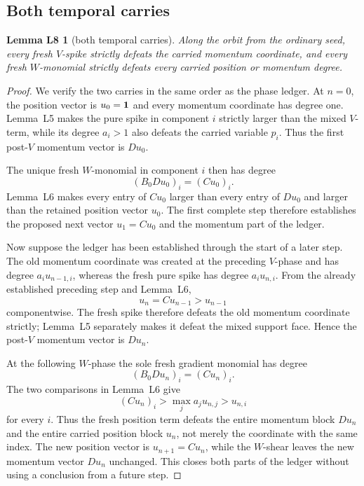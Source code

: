 \documentclass[11pt,letterpaper]{article}
\theoremstyle{plain}
\newtheorem*{lemLeight}{Lemma L8}
\begin{document}
\subsection{Both temporal carries}

\begin{lemLeight}[both temporal carries]
Along the orbit from the ordinary seed, every fresh $V$-spike strictly defeats the carried momentum coordinate, and every fresh $W$-monomial strictly defeats every carried position or momentum degree.
\end{lemLeight}

\begin{proof}
We verify the two carries in the same order as the phase ledger.  At $n=0$, the position vector is $u_0=\mathbf{1}$ and every momentum coordinate has degree one.  Lemma~L5 makes the pure spike in component $i$ strictly larger than the mixed $V$-term, while its degree $a_i>1$ also defeats the carried variable $p_i$.  Thus the first post-$V$ momentum vector is $Du_0$.

The unique fresh $W$-monomial in component $i$ then has degree
\[
(B_0Du_0)_i=(Cu_0)_i.
\]
Lemma~L6 makes every entry of $Cu_0$ larger than every entry of $Du_0$ and larger than the retained position vector $u_0$.  The first complete step therefore establishes the proposed next vector $u_1=Cu_0$ and the momentum part of the ledger.

Now suppose the ledger has been established through the start of a later step.  The old momentum coordinate was created at the preceding $V$-phase and has degree $a_i u_{n-1,i}$, whereas the fresh pure spike has degree $a_i u_{n,i}$.  From the already established preceding step and Lemma~L6,
\[
u_n=Cu_{n-1}>u_{n-1}
\]
componentwise.  The fresh spike therefore defeats the old momentum coordinate strictly; Lemma~L5 separately makes it defeat the mixed support face.  Hence the post-$V$ momentum vector is $Du_n$.

At the following $W$-phase the sole fresh gradient monomial has degree
\[
(B_0Du_n)_i=(Cu_n)_i.
\]
The two comparisons in Lemma~L6 give
\[
(Cu_n)_i>\max_j a_j u_{n,j}>u_{n,i}
\]
for every $i$.  Thus the fresh position term defeats the entire momentum block $Du_n$ and the entire carried position block $u_n$, not merely the coordinate with the same index.  The new position vector is $u_{n+1}=Cu_n$, while the $W$-shear leaves the new momentum vector $Du_n$ unchanged.  This closes both parts of the ledger without using a conclusion from a future step.


\end{proof}
\end{document}
